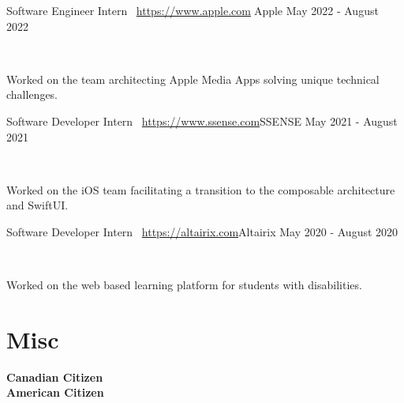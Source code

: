 \documentclass[]{style}
\begin{document}
\begin{entrylist}

\vspace{1mm}

\entry
{Software Engineer Intern \ {\normalfont \url{https://www.apple.com}{Apple}}}
{May 2022 - August 2022}
{ ~ \vspace{-2.5mm}

Worked on the team architecting Apple Media Apps solving unique technical challenges. }

\entry
{Software Developer Intern \ {\normalfont \url{https://www.ssense.com}{SSENSE}}}
{May 2021 - August 2021}
{ ~ \vspace{-2.5mm}

Worked on the iOS team facilitating a transition to the composable architecture and SwiftUI.}

\entry
{Software Developer Intern \ {\normalfont \url{https://altairix.com}{Altairix}}}
{May 2020 - August 2020}
{ ~ \vspace{-2.5mm}

Worked on the web based learning platform for students with disabilities.}

\end{entrylist}

\section{Misc}

\begin{entrylist}

\vspace{1mm}

\textbf{Canadian Citizen}\\

\textbf{American Citizen}

\end{entrylist}


\end{document}
